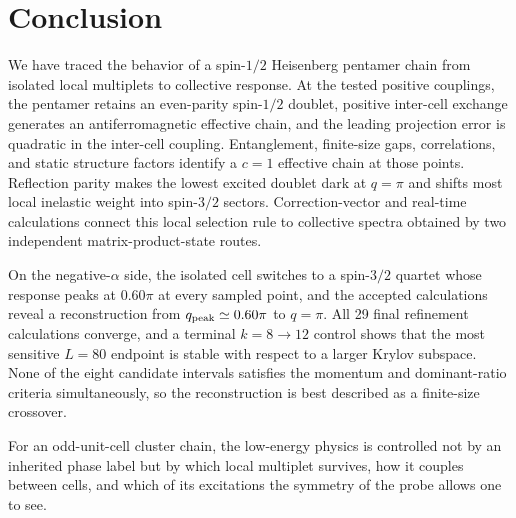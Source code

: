 \section{Conclusion}
\label{sec:conclusion}

We have traced the behavior of a spin-$1/2$ Heisenberg pentamer chain from
isolated local multiplets to collective response.
At the tested positive couplings, the pentamer retains an even-parity spin-$1/2$
doublet, positive inter-cell exchange generates an antiferromagnetic effective
chain, and the leading projection error is quadratic in the inter-cell coupling.
Entanglement, finite-size gaps, correlations, and static structure factors
identify a $c=1$ effective chain at those points.
Reflection parity makes the lowest excited doublet dark at $q=\pi$ and shifts most
local inelastic weight into spin-$3/2$ sectors.
Correction-vector and real-time calculations connect this local selection rule to
collective spectra obtained by two independent matrix-product-state routes.

On the negative-$\alpha$ side, the isolated cell switches to a spin-$3/2$ quartet
whose response peaks at $0.60\pi$ at every sampled point, and the
accepted calculations reveal a reconstruction from $q_{\mathrm{peak}}\simeq0.60\pi$ to
$q=\pi$.
All 29 final refinement calculations converge, and a
terminal $k=8\rightarrow12$ control shows that the most sensitive $L=80$ endpoint
is stable with respect to a larger Krylov subspace.
None of the eight candidate intervals satisfies the momentum and dominant-ratio
criteria simultaneously, so the reconstruction is best described as a
finite-size crossover.

For an odd-unit-cell cluster chain, the low-energy physics is controlled not by an
inherited phase label but by which local multiplet survives, how it couples
between cells, and which of its excitations the symmetry of the probe allows one
to see.
